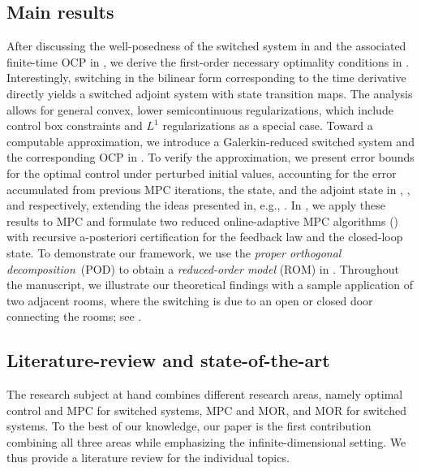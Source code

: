 \documentclass[reqno]{amsart}
\newcommand{\abbr}[1]{\textsf{#1}\xspace}
\newcommand{\ROM}{\abbr{ROM}}
\newcommand{\MPC}{\abbr{MPC}}
\newcommand{\MOR}{\abbr{MOR}}
\newcommand{\OCP}{\abbr{OCP}}
\newcommand{\POD}{\abbr{POD}} %
\begin{document}
\subsection{Main results}
After discussing the well-posedness of the switched system in  and the associated finite-time \OCP in , we derive the first-order necessary optimality conditions in . Interestingly, switching in the bilinear form corresponding to the time derivative directly yields a switched adjoint system with state transition maps. The analysis allows for general convex, lower semicontinuous regularizations, which include control box constraints and $L^1$ regularizations as a special case. Toward a computable approximation, we introduce a Galerkin-reduced switched system and the corresponding \OCP in . To verify the approximation, we present error bounds for the optimal control under perturbed initial values, accounting for the error accumulated from previous \MPC iterations, the state, and the adjoint state in , , and  respectively, extending the ideas presented in, e.g., \cite{DBLP:journals/coap/TroltzschV09,bader2016certified,AliH18}. In , we apply these results to \MPC and formulate two reduced online-adaptive \MPC algorithms () with recursive a-posteriori certification for the feedback law and the closed-loop state. To demonstrate our framework, we use the \emph{proper orthogonal decomposition}~(\POD) to obtain a \emph{reduced-order model} (\ROM) in . Throughout the manuscript, we illustrate our theoretical findings with a sample application of two adjacent rooms, where the switching is due to an open or closed door connecting the rooms; see . 
%
\subsection{Literature-review and state-of-the-art}
The research subject at hand combines different research areas, namely optimal control and \MPC for switched systems, \MPC and \MOR, and \MOR for switched systems. To the best of our knowledge, our paper is the first contribution combining all three areas while emphasizing the infinite-dimensional setting. We thus provide a literature review for the individual topics.
\end{document}
